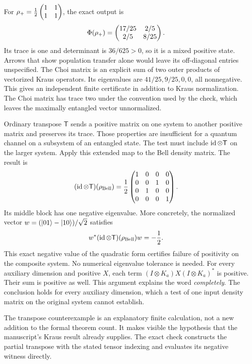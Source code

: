 For $\rho_+=\frac12\begin{pmatrix}1&1\\1&1\end{pmatrix}$, the exact output is
\[
\Phi(\rho_+)=\begin{pmatrix}17/25&2/5\\2/5&8/25\end{pmatrix}.
\]
Its trace is one and determinant is $36/625>0$, so it is a mixed positive state. Arrows that show population transfer alone would leave its off-diagonal entries unspecified.
The Choi matrix is an explicit sum of two outer products of vectorized Kraus operators. Its eigenvalues are $41/25,9/25,0,0$, all nonnegative. This gives an independent finite certificate in addition to Kraus normalization. The Choi matrix has trace two under the convention used by the check, which leaves the maximally entangled vector unnormalized.

Ordinary transpose $\mathsf T$ sends a positive matrix on one system to another positive matrix and preserves its trace. Those properties are insufficient for a quantum channel on a subsystem of an entangled state. The test must include $\operatorname{id}\otimes\mathsf T$ on the larger system.
Apply this extended map to the Bell density matrix. The result is
\[
(\operatorname{id}\otimes\mathsf T)(\rho_{\rm Bell})
=\frac12\begin{pmatrix}1&0&0&0\\0&0&1&0\\0&1&0&0\\0&0&0&1\end{pmatrix}.
\]
Its middle block has one negative eigenvalue. More concretely, the normalized vector $w=(\lvert 01\rangle-\lvert 10\rangle)/\sqrt2$ satisfies
\[
w^*(\operatorname{id}\otimes\mathsf T)(\rho_{\rm Bell})w=-\frac12.
\]
This exact negative value of the quadratic form certifies failure of positivity on the composite system. No numerical eigenvalue tolerance is needed.
For every auxiliary dimension and positive $X$, each term $(I\otimes K_a)X(I\otimes K_a)^*$ is positive. Their sum is positive as well. This argument explains the word \emph{completely}. The conclusion holds for every auxiliary dimension, which a test of one input density matrix on the original system cannot establish.

The transpose counterexample is an explanatory finite calculation, not a new addition to the formal theorem count. It makes visible the hypothesis that the manuscript's Kraus result already supplies. The exact check constructs the partial transpose with the stated tensor indexing and evaluates its negative witness directly.

